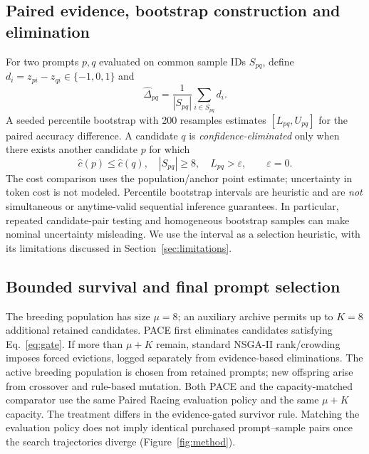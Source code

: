 \documentclass{article}
\begin{document}
\subsection{Paired evidence, bootstrap construction and elimination}
\label{sec:bootstrap-details}
For two prompts $p,q$ evaluated on common sample IDs $S_{pq}$, define $d_i=z_{pi}-z_{qi}\in\{-1,0,1\}$ and
\begin{equation}
\widehat\Delta_{pq}=\frac{1}{|S_{pq}|}\sum_{i\in S_{pq}}d_i.
\end{equation}
A seeded percentile bootstrap with 200 resamples estimates $[L_{pq},U_{pq}]$ for the paired accuracy difference. A candidate $q$ is \emph{confidence-eliminated} only when there exists another candidate $p$ for which
\begin{equation}
\widehat c(p)\le \widehat c(q),\quad |S_{pq}|\ge 8,\quad L_{pq}>\varepsilon,\qquad \varepsilon=0.
\label{eq:gate}
\end{equation}
The cost comparison uses the population/anchor point estimate; uncertainty in token cost is not modeled. Percentile bootstrap intervals are heuristic and are \emph{not} simultaneous or anytime-valid sequential inference guarantees. In particular, repeated candidate-pair testing and homogeneous bootstrap samples can make nominal uncertainty misleading. We use the interval as a selection heuristic, with its limitations discussed in Section~\ref{sec:limitations}.



\subsection{Bounded survival and final prompt selection}
\label{sec:algorithm}
The breeding population has size $\mu=8$; an auxiliary archive permits up to $K=8$ additional retained candidates. PACE first eliminates candidates satisfying Eq.~\eqref{eq:gate}. If more than $\mu+K$ remain, standard NSGA-II rank/crowding imposes forced evictions, logged separately from evidence-based eliminations. The active breeding population is chosen from retained prompts; new offspring arise from crossover and rule-based mutation. Both PACE and the capacity-matched comparator use the same Paired Racing evaluation policy and the same $\mu+K$ capacity. The treatment differs in the evidence-gated survivor rule. Matching the evaluation
policy does not imply identical purchased prompt--sample pairs once the search
trajectories diverge (Figure~\ref{fig:method}).
\end{document}
